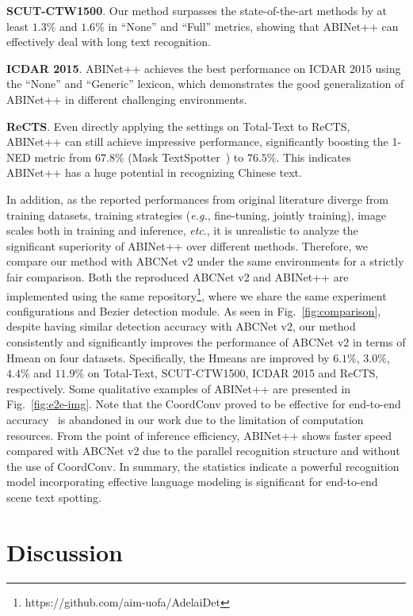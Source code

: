 \documentclass[10pt,journal,compsoc]{IEEEtran}
\def\eg{{\it e.g.}\xspace}
\def\etc{{\it etc}\xspace}
\begin{document}
\textbf{SCUT-CTW1500}. Our method surpasses the state-of-the-art methods by at least $1.3\%$ and $1.6\%$ in “None” and “Full” metrics, showing that ABINet++ can effectively deal with long text recognition.

\textbf{ICDAR 2015}. ABINet++ achieves the best performance on ICDAR 2015 using the “None” and “Generic” lexicon, which demonstrates the good generalization of ABINet++ in different challenging environments.

\textbf{ReCTS}. Even directly applying the settings on Total-Text to ReCTS, ABINet++ can still achieve impressive performance, significantly boosting the 1-NED metric from $67.8\%$ (Mask TextSpotter~\cite{liao2019mask}) to $76.5\%$. This indicates ABINet++ has a huge potential in recognizing Chinese text.


In addition, as the reported performances from original literature diverge from training datasets, training strategies (\eg, fine-tuning, jointly training), image scales both in training and inference, \etc., it is unrealistic to analyze the significant superiority of ABINet++ over different methods. Therefore, we compare our method with ABCNet v2 under the same environments for a strictly fair comparison. Both the reproduced ABCNet v2 and ABINet++ are implemented using the same repository\footnote{https://github.com/aim-uofa/AdelaiDet}, where we share the same experiment configurations and Bezier detection module. As seen in Fig.~\ref{fig:comparison}, despite having similar detection accuracy with ABCNet v2, our method consistently and significantly improves the performance of ABCNet v2 in terms of Hmean on four datasets. Specifically, the Hmeans are improved by $6.1\%$, $3.0\%$, $4.4\%$ and $11.9\%$ on Total-Text, SCUT-CTW1500, ICDAR 2015 and ReCTS, respectively. Some qualitative examples of ABINet++ are presented in Fig.~\ref{fig:e2e-img}. Note that the CoordConv proved to be effective for end-to-end accuracy~\cite{liu2020abcnetv2} is abandoned in our work due to the limitation of computation resources. From the point of inference efficiency, ABINet++ shows faster speed compared with ABCNet v2 due to the parallel recognition structure and without the use of CoordConv. In summary, the statistics indicate a powerful recognition model incorporating effective language modeling is significant for end-to-end scene text spotting.





\section{Discussion}
\end{document}
